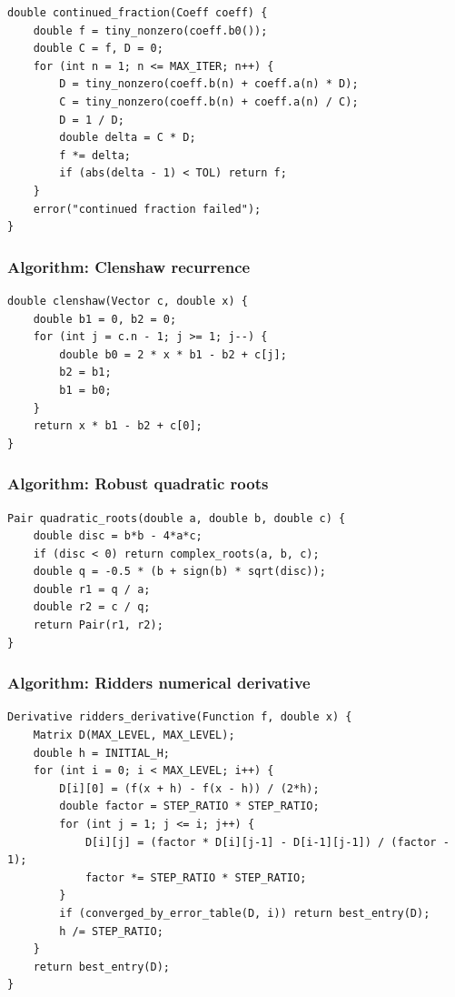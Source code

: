 \documentclass[11pt]{article}
\begin{document}
\begin{verbatim}
double continued_fraction(Coeff coeff) {
    double f = tiny_nonzero(coeff.b0());
    double C = f, D = 0;
    for (int n = 1; n <= MAX_ITER; n++) {
        D = tiny_nonzero(coeff.b(n) + coeff.a(n) * D);
        C = tiny_nonzero(coeff.b(n) + coeff.a(n) / C);
        D = 1 / D;
        double delta = C * D;
        f *= delta;
        if (abs(delta - 1) < TOL) return f;
    }
    error("continued fraction failed");
}
\end{verbatim}

\subsubsection{Algorithm: Clenshaw recurrence}\label{algorithm-clenshaw-recurrence}

\begin{verbatim}
double clenshaw(Vector c, double x) {
    double b1 = 0, b2 = 0;
    for (int j = c.n - 1; j >= 1; j--) {
        double b0 = 2 * x * b1 - b2 + c[j];
        b2 = b1;
        b1 = b0;
    }
    return x * b1 - b2 + c[0];
}
\end{verbatim}

\subsubsection{Algorithm: Robust quadratic roots}\label{algorithm-robust-quadratic-roots}

\begin{verbatim}
Pair quadratic_roots(double a, double b, double c) {
    double disc = b*b - 4*a*c;
    if (disc < 0) return complex_roots(a, b, c);
    double q = -0.5 * (b + sign(b) * sqrt(disc));
    double r1 = q / a;
    double r2 = c / q;
    return Pair(r1, r2);
}
\end{verbatim}

\subsubsection{Algorithm: Ridders numerical derivative}\label{algorithm-ridders-numerical-derivative}

\begin{verbatim}
Derivative ridders_derivative(Function f, double x) {
    Matrix D(MAX_LEVEL, MAX_LEVEL);
    double h = INITIAL_H;
    for (int i = 0; i < MAX_LEVEL; i++) {
        D[i][0] = (f(x + h) - f(x - h)) / (2*h);
        double factor = STEP_RATIO * STEP_RATIO;
        for (int j = 1; j <= i; j++) {
            D[i][j] = (factor * D[i][j-1] - D[i-1][j-1]) / (factor - 1);
            factor *= STEP_RATIO * STEP_RATIO;
        }
        if (converged_by_error_table(D, i)) return best_entry(D);
        h /= STEP_RATIO;
    }
    return best_entry(D);
}
\end{verbatim}
\end{document}
